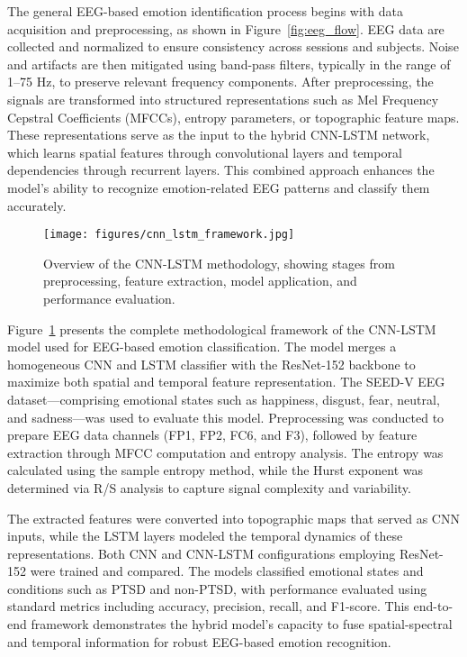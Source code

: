 \documentclass[conference]{IEEEtran}
\begin{document}
The general EEG-based emotion identification process begins with data acquisition and preprocessing, as shown in Figure~\ref{fig:eeg_flow}. EEG data are collected and normalized to ensure consistency across sessions and subjects. Noise and artifacts are then mitigated using band-pass filters, typically in the range of 1–75 Hz, to preserve relevant frequency components. After preprocessing, the signals are transformed into structured representations such as Mel Frequency Cepstral Coefficients (MFCCs), entropy parameters, or topographic feature maps. These representations serve as the input to the hybrid CNN-LSTM network, which learns spatial features through convolutional layers and temporal dependencies through recurrent layers. This combined approach enhances the model’s ability to recognize emotion-related EEG patterns and classify them accurately.

\begin{figure}[H]
    \centering
    \texttt{[image: figures/cnn\_lstm\_framework.jpg]}
    \caption{Overview of the CNN-LSTM methodology, showing stages from preprocessing, feature extraction, model application, and performance evaluation.}
    \label{fig:cnn_lstm_framework}
\end{figure}

Figure~\ref{fig:cnn_lstm_framework} presents the complete methodological framework of the CNN-LSTM model used for EEG-based emotion classification. The model merges a homogeneous CNN and LSTM classifier with the ResNet-152 backbone to maximize both spatial and temporal feature representation. The SEED-V EEG dataset—comprising emotional states such as happiness, disgust, fear, neutral, and sadness—was used to evaluate this model. Preprocessing was conducted to prepare EEG data channels (FP1, FP2, FC6, and F3), followed by feature extraction through MFCC computation and entropy analysis. The entropy was calculated using the sample entropy method, while the Hurst exponent was determined via R/S analysis to capture signal complexity and variability.

The extracted features were converted into topographic maps that served as CNN inputs, while the LSTM layers modeled the temporal dynamics of these representations. Both CNN and CNN-LSTM configurations employing ResNet-152 were trained and compared. The models classified emotional states and conditions such as PTSD and non-PTSD, with performance evaluated using standard metrics including accuracy, precision, recall, and F1-score. This end-to-end framework demonstrates the hybrid model’s capacity to fuse spatial-spectral and temporal information for robust EEG-based emotion recognition.
\end{document}
